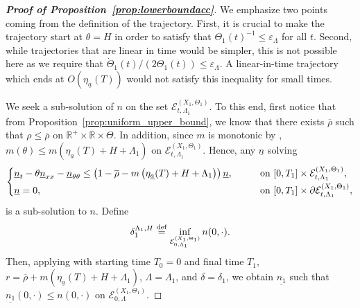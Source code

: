 \documentclass[11pt]{article}    %
\newcommand{\R}{\mathbb{R}}
\renewcommand{\epsilon}{\varepsilon}
\begin{document}
\begin{proof}[{\bf Proof of Proposition~\ref{prop:lowerboundacc}}]
We emphasize two points coming from the definition of the trajectory.  First, it is crucial to make the trajectory start at $\theta = H$ in order to satisfy that $\Theta_1(t)^{-1} \leq \epsilon_\Lambda$ for all $t$.  Second, while trajectories that are linear in time would be simpler, this is not possible here as we require that $\dot\Theta_1(t)/(2\Theta_1(t)) \leq \epsilon_\Lambda$.  A linear-in-time trajectory which ends at $O(\eta_{\underline a}(T))$ would not satisfy this inequality for small times.

We seek a sub-solution of $n$ on the set $\mathcal{E}_{t,\Lambda_1}^{\left( X_1 , \Theta_1 \right)}$. To this end, first notice that from Proposition~\ref{prop:uniform_upper_bound}, we know that there exists $\overline\rho$ such that $\rho \leq \overline \rho$ on $\R^+ \times \R\times\Theta$.  In addition, since $m$ is monotonic by , $m(\theta) \leq m(\eta_{\underline a}(T) + H + \Lambda_1)$ on $\mathcal{E}_{t,\Lambda_1}^{\left( X_1 , \Theta_1 \right)}$.  Hence, any $\underline n$ solving 
\[\begin{cases}
	\underline n_t - \theta \underline n_{xx} - \underline n_{\theta\theta} \leq  \left(1 - \overline \rho - m \left(\eta_{\underline a}(T) + H + \Lambda_1 \right) \right)\underline n, & \qquad \text{on } [0,T_1] \times \mathcal{E}_{t,\Lambda_1}^{\left( X_1 , \Theta_1 \right)},\smallskip\\
	\underline n = 0,  &\qquad \text{on } [0,T_1] \times \partial\mathcal{E}_{t,\Lambda_1}^{\left( X_1 , \Theta_1 \right)}, 
\end{cases}\]
is a sub-solution to $n$.  Define
\[
	\delta_1^{\Lambda_1,H} \stackrel{\rm def}{=} \inf_{\mathcal{E}_{0,\Lambda_1}^{\left( X_1 , \Theta_1 \right)}} n(0,\cdot).
\]
Then, applying  with starting time $T_0 = 0$ and final time $T_1$, $r = \overline \rho + m(\eta_{\underline a}(T) + H + \Lambda_1)$, $\Lambda = \Lambda_1$, and $\delta = \delta_1$, we obtain $\underline{n_1}$  such that $\underline{n_1}(0,\cdot) \leq n(0,\cdot)$ on $\mathcal{E}_{0,\Lambda}^{\left( X_1 , \Theta_1 \right)}$.  



\end{proof}
\end{document}
